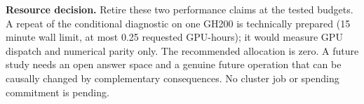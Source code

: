 \par
\textbf{Resource decision.} Retire these two performance claims at the tested budgets. A repeat of the conditional diagnostic on one GH200 is technically prepared (15 minute wall limit, at most 0.25 requested GPU-hours); it would measure GPU dispatch and numerical parity only. The recommended allocation is zero. A future study needs an open answer space and a genuine future operation that can be causally changed by complementary consequences. No cluster job or spending commitment is pending.
